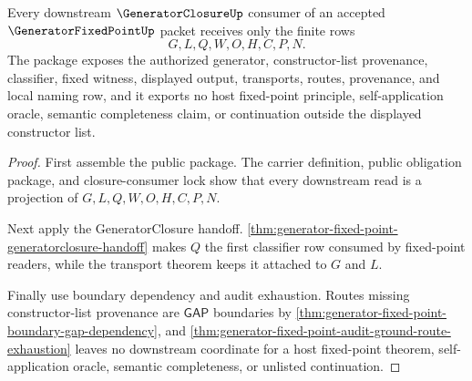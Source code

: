 \begin{theorem}
\label{thm:generator-fixed-point-downstream-unblock-package}
Every downstream $\GeneratorClosureUp$ consumer of an accepted $\GeneratorFixedPointUp$ packet receives only the finite rows
$$
G,L,Q,W,O,H,C,P,N.
$$
The package exposes the authorized generator, constructor-list provenance, classifier, fixed witness, displayed output, transports, routes, provenance, and local naming row, and it exports no host fixed-point principle, self-application oracle, semantic completeness claim, or continuation outside the displayed constructor list.
\end{theorem}
\begin{proof}
First assemble the public package. The carrier definition, public obligation package, and closure-consumer lock show that every downstream read is a projection of $G,L,Q,W,O,H,C,P,N$.

Next apply the GeneratorClosure handoff. \autoref{thm:generator-fixed-point-generatorclosure-handoff} makes $Q$ the first classifier row consumed by fixed-point readers, while the transport theorem keeps it attached to $G$ and $L$.

Finally use boundary dependency and audit exhaustion. Routes missing constructor-list provenance are $\mathsf{GAP}$ boundaries by \autoref{thm:generator-fixed-point-boundary-gap-dependency}, and \autoref{thm:generator-fixed-point-audit-ground-route-exhaustion} leaves no downstream coordinate for a host fixed-point theorem, self-application oracle, semantic completeness, or unlisted continuation.
\end{proof}

